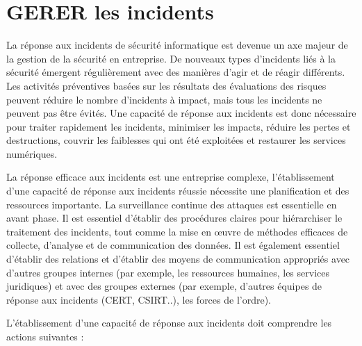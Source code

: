 %
%
\section{GERER les incidents}


La réponse aux incidents de sécurité informatique est devenue un axe majeur de la gestion de la sécurité en entreprise. De nouveaux types d'incidents liés à la sécurité émergent régulièrement avec des manières d'agir et de réagir différents. Les activités préventives basées sur les résultats des évaluations des risques peuvent réduire le nombre d'incidents à impact, mais tous les incidents ne peuvent pas être évités. Une capacité de réponse aux incidents est donc nécessaire pour traiter rapidement les incidents, minimiser les impacts, réduire les pertes et destructions, couvrir les faiblesses qui ont été exploitées et restaurer les services numériques. 

La réponse efficace aux incidents est une entreprise complexe, l'établissement d'une capacité de réponse aux incidents réussie nécessite une planification et des ressources importante. La surveillance continue des attaques est essentielle en avant phase. Il est essentiel d'établir des procédures claires pour hiérarchiser le traitement des incidents, tout comme la mise en œuvre de méthodes efficaces de collecte, d'analyse et de communication des données. Il est également essentiel d'établir des relations et d'établir des moyens de communication appropriés avec d'autres groupes internes (par exemple, les ressources humaines, les services juridiques) et avec des groupes externes (par exemple, d'autres équipes de réponse aux incidents (CERT, CSIRT..), les forces de l'ordre).


L'établissement d'une capacité de réponse aux incidents doit comprendre les actions suivantes :

